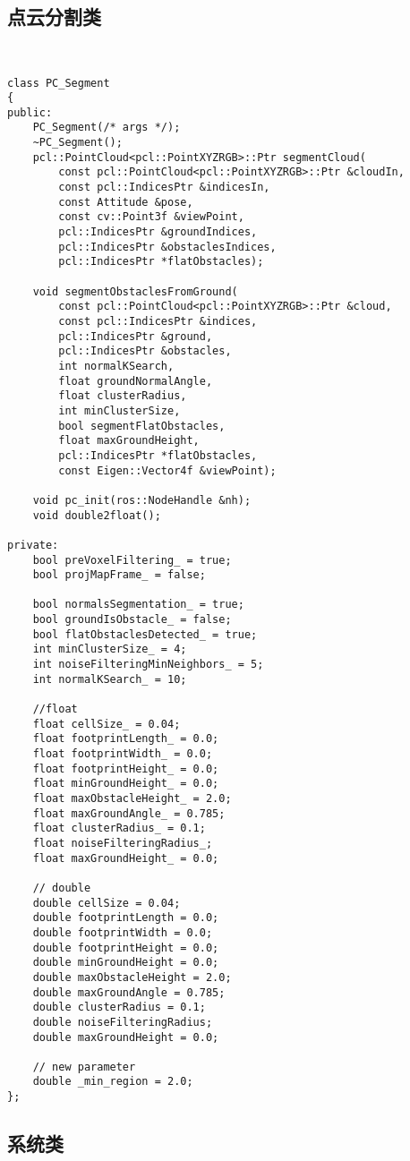 \documentclass[UTF8]{ctexart}
\begin{document}
\subsection{点云分割类}

\begin{lstlisting}[caption={}]


class PC_Segment
{
public:
	PC_Segment(/* args */);
	~PC_Segment();
	pcl::PointCloud<pcl::PointXYZRGB>::Ptr segmentCloud(
		const pcl::PointCloud<pcl::PointXYZRGB>::Ptr &cloudIn,
		const pcl::IndicesPtr &indicesIn,
		const Attitude &pose,
		const cv::Point3f &viewPoint,
		pcl::IndicesPtr &groundIndices,
		pcl::IndicesPtr &obstaclesIndices,
		pcl::IndicesPtr *flatObstacles);

	void segmentObstaclesFromGround(
		const pcl::PointCloud<pcl::PointXYZRGB>::Ptr &cloud,
		const pcl::IndicesPtr &indices,
		pcl::IndicesPtr &ground,
		pcl::IndicesPtr &obstacles,
		int normalKSearch,
		float groundNormalAngle,
		float clusterRadius,
		int minClusterSize,
		bool segmentFlatObstacles,
		float maxGroundHeight,
		pcl::IndicesPtr *flatObstacles,
		const Eigen::Vector4f &viewPoint);

	void pc_init(ros::NodeHandle &nh);
	void double2float();

private:
	bool preVoxelFiltering_ = true;
	bool projMapFrame_ = false;

	bool normalsSegmentation_ = true;
	bool groundIsObstacle_ = false;
	bool flatObstaclesDetected_ = true;
	int minClusterSize_ = 4;
	int noiseFilteringMinNeighbors_ = 5;
	int normalKSearch_ = 10;

	//float
	float cellSize_ = 0.04;
	float footprintLength_ = 0.0;
	float footprintWidth_ = 0.0;
	float footprintHeight_ = 0.0;
	float minGroundHeight_ = 0.0;
	float maxObstacleHeight_ = 2.0;
	float maxGroundAngle_ = 0.785;
	float clusterRadius_ = 0.1;
	float noiseFilteringRadius_;
	float maxGroundHeight_ = 0.0;

	// double
	double cellSize = 0.04;
	double footprintLength = 0.0;
	double footprintWidth = 0.0;
	double footprintHeight = 0.0;
	double minGroundHeight = 0.0;
	double maxObstacleHeight = 2.0;
	double maxGroundAngle = 0.785;
	double clusterRadius = 0.1;
	double noiseFilteringRadius;
	double maxGroundHeight = 0.0;

	// new parameter
	double _min_region = 2.0;
};
\end{lstlisting}

\subsection{系统类}
\end{document}
